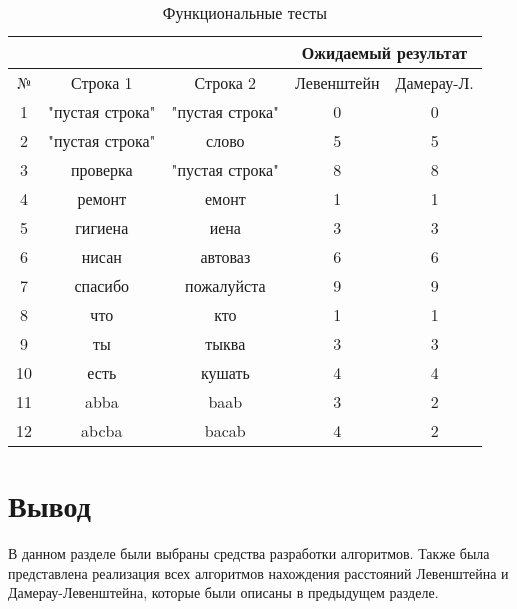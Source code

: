 \begin{table}[h]
	\begin{center}
        \begin{threeparttable}
        \captionsetup{justification=raggedright,singlelinecheck=off}
		\caption{\label{tbl:functional_test} Функциональные тесты}
		\begin{tabular}{|c|c|c|c|c|}
			\hline
			& & & \multicolumn{2}{c|}{Ожидаемый результат} \\
			\hline
			№&Строка 1&Строка 2&Левенштейн&Дамерау-Л. \\
			\hline
            1&"пустая строка"&"пустая строка"&0&0 \\
            \hline
            2&"пустая строка"&слово&5&5 \\
            \hline
            3&проверка&"пустая строка"&8&8 \\
            \hline
            4&ремонт&емонт&1&1 \\
			\hline
			5&гигиена&иена&3&3 \\
			\hline
            6&нисан&автоваз&6&6 \\
			\hline
			7&спасибо&пожалуйста&9&9 \\
			\hline
            8&что&кто&1&1 \\
			\hline
            9&ты&тыква&3&3 \\
			\hline
            10&есть&кушать&4&4 \\
			\hline
			11&abba&baab&3&2 \\
			\hline
            12&abcba&bacab&4&2 \\
			\hline
		\end{tabular}
        \end{threeparttable}
	\end{center}
\end{table}

\section{Вывод}

В данном разделе были выбраны средства  разработки алгоритмов.
Также была представлена реализация всех алгоритмов нахождения расстояний Левенштейна и Дамерау-Левенштейна, которые были описаны в предыдущем разделе.

